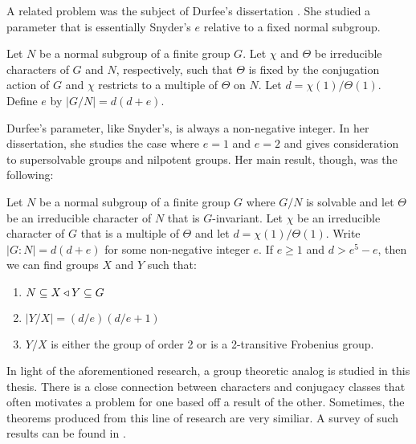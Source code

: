 \documentclass[main.tex]{subfiles}
\begin{document}
A related problem was the subject of Durfee's dissertation \cite{durfeedissertation}. She studied a parameter that is essentially Snyder's $e$ relative to a fixed normal subgroup. 

\hss

\begin{definition}
Let $N$ be a normal subgroup of a finite group $G$. Let $\chi$ and $\Theta$ be irreducible characters of $G$ and $N$, respectively, such that $\Theta$ is fixed by the conjugation action of $G$ and $\chi$ restricts to a multiple of $\Theta$ on $N$. Let $d = \chi(1)/\Theta(1)$. Define $e$ by $|G/N| = d(d+e)$.
\end{definition}

\hss

\noindent Durfee's parameter, like Snyder's, is always a non-negative integer. In her dissertation, she studies the case where $e = 1$ and $e = 2$ and gives consideration to supersolvable groups and nilpotent groups. Her main result, though, was the following:

\hss

\begin{theorem}
Let $N$ be a normal subgroup of a finite group $G$ where $G/N$ is solvable and let $\Theta$ be an irreducible character of $N$ that is $G$-invariant. Let $\chi$ be an irreducible character of $G$ that is a multiple of $\Theta$ and let $d = \chi(1)/\Theta(1)$. Write $|G:N| = d(d+e)$ for some non-negative integer $e$. If $e \ge 1$ and $d > e^5 - e$, then we can find groups $X$ and $Y$ such that:
\begin{enumerate}
	\item $N \subseteq X \triangleleft Y \subseteq G$
	\item $|Y/X| = (d/e)(d/e+1)$
	\item $Y/X$ is either the group of order 2 or is a 2-transitive Frobenius group.
\end{enumerate}
\end{theorem}

\hss

In light of the aforementioned research, a group theoretic analog is studied in this thesis. There is a close connection between characters and conjugacy classes that often motivates a problem for one based off a result of the other. Sometimes, the theorems produced from this line of research are very similiar. A survey of such results can be found in \cite{chillagarticle}.
\end{document}
